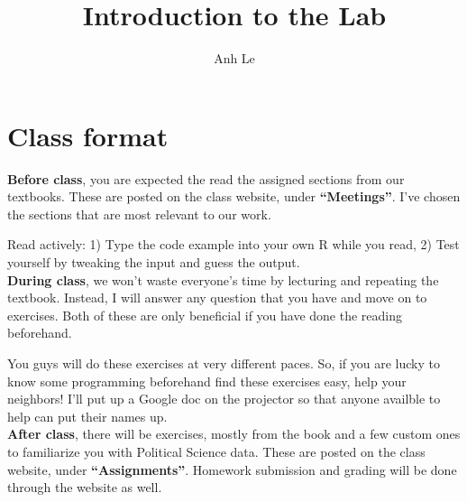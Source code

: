 \documentclass{article}\usepackage[]{graphicx}\usepackage[]{color}
\title{Introduction to the Lab}
\author{Anh Le}
\begin{document}
\maketitle

\section{Class format}

\textbf{Before class}, you are expected the read the assigned sections from our textbooks. These are posted on the class website, under \textbf{``Meetings''}. I've chosen the sections that are most relevant to our work.

Read actively: 1) Type the code example into your own R while you read, 2) Test yourself by tweaking the input and guess the output.\\

\textbf{During class}, we won't waste everyone's time by lecturing and repeating the textbook. Instead, I will answer any question that you have and move on to exercises. Both of these are only beneficial if you have done the reading beforehand.

You guys will do these exercises at very different paces. So, if you are lucky to know some programming beforehand find these exercises easy, help your neighbors! I'll put up a Google doc on the projector so that anyone availble to help can put their names up.\\

\textbf{After class}, there will be exercises, mostly from the book and a few custom ones to familiarize you with Political Science data. These are posted on the class website, under \textbf{``Assignments''}. Homework submission and grading will be done through the website as well.\\
\end{document}
